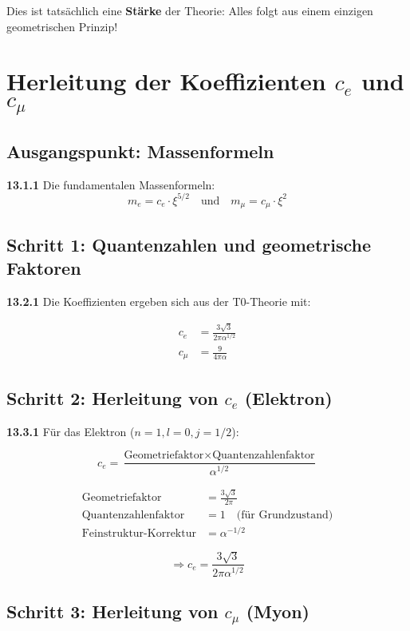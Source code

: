 \documentclass[12pt,a4paper]{article}
\begin{document}
Dies ist tatsächlich eine \textbf{Stärke} der Theorie: Alles folgt aus einem einzigen geometrischen Prinzip!


\section{Herleitung der Koeffizienten $c_e$ und $c_\mu$}

\subsection{Ausgangspunkt: Massenformeln}

\noindent \textbf{13.1.1} Die fundamentalen Massenformeln:
\[
m_e = c_e \cdot \xi^{5/2} \quad \text{und} \quad m_\mu = c_\mu \cdot \xi^2
\]

\subsection{Schritt 1: Quantenzahlen und geometrische Faktoren}

\noindent \textbf{13.2.1} Die Koeffizienten ergeben sich aus der T0-Theorie mit:

\begin{align*}
	c_e &= \frac{3\sqrt{3}}{2\pi\alpha^{1/2}} \\
	c_\mu &= \frac{9}{4\pi\alpha}
\end{align*}

\subsection{Schritt 2: Herleitung von $c_e$ (Elektron)}

\noindent \textbf{13.3.1} Für das Elektron ($n=1, l=0, j=1/2$):

\[
c_e = \frac{\text{Geometriefaktor} \times \text{Quantenzahlenfaktor}}{\alpha^{1/2}}
\]

\begin{align*}
	\text{Geometriefaktor} &= \frac{3\sqrt{3}}{2\pi} \\
	\text{Quantenzahlenfaktor} &= 1 \quad \text{(für Grundzustand)} \\
	\text{Feinstruktur-Korrektur} &= \alpha^{-1/2}
\end{align*}

\[
\Rightarrow c_e = \frac{3\sqrt{3}}{2\pi\alpha^{1/2}}
\]

\subsection{Schritt 3: Herleitung von $c_\mu$ (Myon)}
\end{document}
